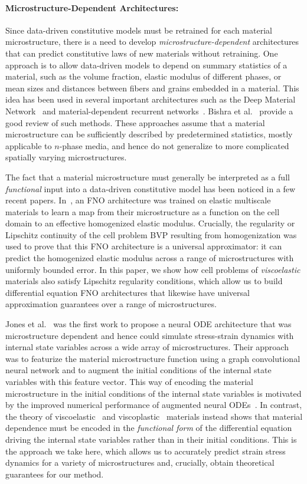 \paragraph{Microstructure-Dependent Architectures:}
Since data-driven constitutive models must be retrained for each material microstructure, there is a need to develop \textit{microstructure-dependent} architectures that can predict constitutive laws of new materials without retraining. One approach is to allow data-driven models to depend on summary statistics of a material, such as the volume fraction, elastic modulus of different phases, or mean sizes and distances between fibers and grains embedded in a material. This idea has been used in several important architectures such as the Deep Material Network~\cite{liu2019deep} and material-dependent recurrent networks~\cite{mozaffar2019deep}. Bishra et al.~\cite{bishara2023state} provide a good review of such methods. These approaches assume that a material microstructure can be sufficiently described by predetermined statistics, mostly applicable to $n$-phase media, and hence do not generalize to more complicated spatially varying microstructures.

The fact that a material microstructure must generally be interpreted as a full \textit{functional} input into a data-driven constitutive model has been noticed in a few recent papers. In~\cite{bhattacharya2024learning}, an FNO architecture was trained on elastic multiscale materials to learn a map from their microstructure as a function on the cell domain to an effective homogenized elastic modulus. Crucially, the regularity or Lipschitz continuity of the cell problem BVP resulting from homogenization was used to prove that this FNO architecture is a universal approximator: it can predict the homogenized elastic modulus across a range of microstructures with uniformly bounded error. In this paper, we show how cell problems of \textit{viscoelastic} materials also satisfy Lipschitz regularity conditions, which allow us to build differential equation FNO architectures that likewise have universal approximation guarantees over a range of microstructures.

Jones et al.~\cite{jones2022neural} was the first work to propose a neural ODE architecture that was microstructure dependent and hence could simulate stress-strain dynamics with internal state variables across a wide array of microstructures. Their approach was to featurize the material microstructure function using a graph convolutional neural network and to augment the initial conditions of the internal state variables with this feature vector. This way of encoding the material microstructure in the initial conditions of the internal state variables is motivated by the improved numerical performance of augmented neural ODEs~\cite{dupont2019augmented}. In contrast, the theory of viscoelastic~\cite{bhattacharya2023learning} and viscoplastic~\cite{liu2023learning} materials instead shows that material dependence must be encoded in the \textit{functional form} of the differential equation driving the internal state variables rather than in their initial conditions. This is the approach we take here, which allows us to accurately predict strain stress dynamics for a variety of microstructures and, crucially, obtain theoretical guarantees for our method.
